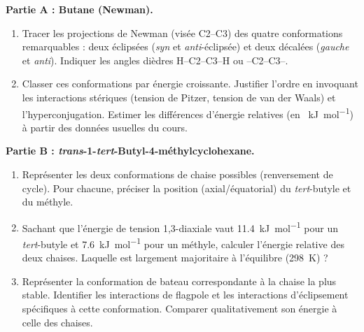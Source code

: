 \documentclass[11pt]{article}
\begin{document}
\begin{exercice}
\textbf{Partie A : Butane (Newman).}
\begin{enumerate}
    \item Tracer les projections de Newman (visée C2--C3) des quatre conformations remarquables : deux éclipsées (\textit{syn} et \textit{anti}-éclipsée) et deux décalées (\textit{gauche} et \textit{anti}). Indiquer les angles dièdres H--C2--C3--H ou --C2--C3--.
    \item Classer ces conformations par énergie croissante. Justifier l'ordre en invoquant les interactions stériques (tension de Pitzer, tension de van der Waals) et l'hyperconjugation. Estimer les différences d'énergie relatives (en \SI{}{\kilo\joule\per\mole}) à partir des données usuelles du cours.
\end{enumerate}

\textbf{Partie B : \textit{trans}-1-\textit{tert}-Butyl-4-méthylcyclohexane.}
\begin{enumerate}
    \item Représenter les deux conformations de chaise possibles (renversement de cycle). Pour chacune, préciser la position (axial/équatorial) du \textit{tert}-butyle et du méthyle.
    \item Sachant que l'énergie de tension 1,3-diaxiale vaut \SI{11,4}{\kilo\joule\per\mole} pour un \textit{tert}-butyle et \SI{7,6}{\kilo\joule\per\mole} pour un méthyle, calculer l'énergie relative des deux chaises. Laquelle est largement majoritaire à l'équilibre (\SI{298}{\kelvin}) ?
    \item Représenter la conformation de bateau correspondante à la chaise la plus stable. Identifier les interactions de flagpole et les interactions d'éclipsement spécifiques à cette conformation. Comparer qualitativement son énergie à celle des chaises.
\end{enumerate}
\end{exercice}
\end{document}

